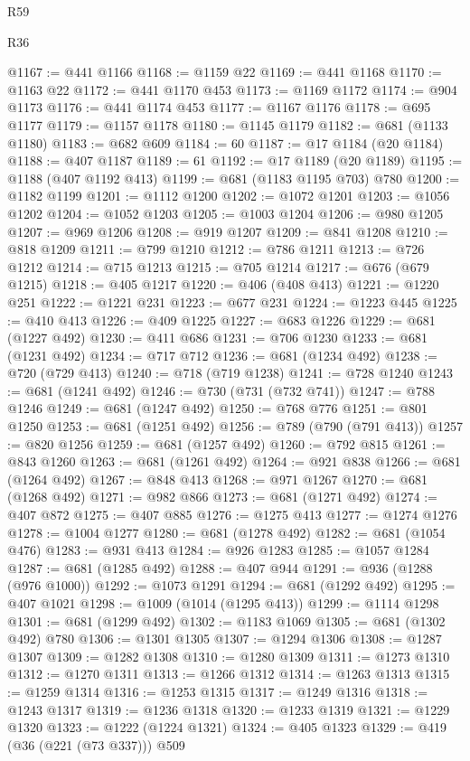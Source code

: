 \begin{lexlean}{R59}
\begin{lexlean}{R36}
\begin{coremodule}
{{{{{{{{{{{{{{{{{{{{{{{{{{{{{{{{{{{{{{{{{{{{{{{{{{{{{{{{{{{{{{{{{{{{{{{{{{{{{{{{{{@1167 := @441 @1166
@1168 := @1159 @22
@1169 := @441 @1168
@1170 := @1163 @22
@1172 := @441 @1170 @453
@1173 := @1169 @1172
@1174 := @904 @1173
@1176 := @441 @1174 @453
@1177 := @1167 @1176
@1178 := @695 @1177
@1179 := @1157 @1178
@1180 := @1145 @1179
@1182 := @681 (@1133 @1180)
@1183 := @682 @609
@1184 := 60
@1187 := @17 @1184 (@20 @1184)
@1188 := @407 @1187
@1189 := 61
@1192 := @17 @1189 (@20 @1189)
@1195 := @1188 (@407 @1192 @413)
@1199 := @681 (@1183 @1195 @703) @780
@1200 := @1182 @1199
@1201 := @1112 @1200
@1202 := @1072 @1201
@1203 := @1056 @1202
@1204 := @1052 @1203
@1205 := @1003 @1204
@1206 := @980 @1205
@1207 := @969 @1206
@1208 := @919 @1207
@1209 := @841 @1208
@1210 := @818 @1209
@1211 := @799 @1210
@1212 := @786 @1211
@1213 := @726 @1212
@1214 := @715 @1213
@1215 := @705 @1214
@1217 := @676 (@679 @1215)
@1218 := @405 @1217
@1220 := @406 (@408 @413)
@1221 := @1220 @251
@1222 := @1221 @231
@1223 := @677 @231
@1224 := @1223 @445
@1225 := @410 @413
@1226 := @409 @1225
@1227 := @683 @1226
@1229 := @681 (@1227 @492)
@1230 := @411 @686
@1231 := @706 @1230
@1233 := @681 (@1231 @492)
@1234 := @717 @712
@1236 := @681 (@1234 @492)
@1238 := @720 (@729 @413)
@1240 := @718 (@719 @1238)
@1241 := @728 @1240
@1243 := @681 (@1241 @492)
@1246 := @730 (@731 (@732 @741))
@1247 := @788 @1246
@1249 := @681 (@1247 @492)
@1250 := @768 @776
@1251 := @801 @1250
@1253 := @681 (@1251 @492)
@1256 := @789 (@790 (@791 @413))
@1257 := @820 @1256
@1259 := @681 (@1257 @492)
@1260 := @792 @815
@1261 := @843 @1260
@1263 := @681 (@1261 @492)
@1264 := @921 @838
@1266 := @681 (@1264 @492)
@1267 := @848 @413
@1268 := @971 @1267
@1270 := @681 (@1268 @492)
@1271 := @982 @866
@1273 := @681 (@1271 @492)
@1274 := @407 @872
@1275 := @407 @885
@1276 := @1275 @413
@1277 := @1274 @1276
@1278 := @1004 @1277
@1280 := @681 (@1278 @492)
@1282 := @681 (@1054 @476)
@1283 := @931 @413
@1284 := @926 @1283
@1285 := @1057 @1284
@1287 := @681 (@1285 @492)
@1288 := @407 @944
@1291 := @936 (@1288 (@976 @1000))
@1292 := @1073 @1291
@1294 := @681 (@1292 @492)
@1295 := @407 @1021
@1298 := @1009 (@1014 (@1295 @413))
@1299 := @1114 @1298
@1301 := @681 (@1299 @492)
@1302 := @1183 @1069
@1305 := @681 (@1302 @492) @780
@1306 := @1301 @1305
@1307 := @1294 @1306
@1308 := @1287 @1307
@1309 := @1282 @1308
@1310 := @1280 @1309
@1311 := @1273 @1310
@1312 := @1270 @1311
@1313 := @1266 @1312
@1314 := @1263 @1313
@1315 := @1259 @1314
@1316 := @1253 @1315
@1317 := @1249 @1316
@1318 := @1243 @1317
@1319 := @1236 @1318
@1320 := @1233 @1319
@1321 := @1229 @1320
@1323 := @1222 (@1224 @1321)
@1324 := @405 @1323
@1329 := @419 (@36 (@221 (@73 @337))) @509
}}}}}}}}}}}}}}}}}}}}}}}}}}}}}}}}}}}}}}}}}}}}}}}}}}}}}}}}}}}}}}}}}}}}}}}}}}}}}}}}}}
\end{coremodule}
\end{lexlean}
\end{lexlean}
